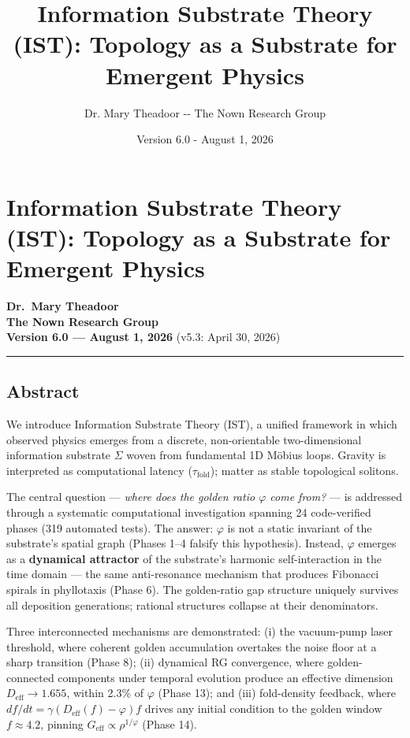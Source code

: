 \documentclass[
]{article}
\title{Information Substrate Theory (IST): Topology as a Substrate for
Emergent Physics}
\author{Dr. Mary Theadoor -\/- The Nown Research Group}
\date{Version 6.0 - August 1, 2026}
\begin{document}
\maketitle

{
\setcounter{tocdepth}{3}
\tableofcontents
}
\section{Information Substrate Theory (IST): Topology as a Substrate for
Emergent
Physics}\label{information-substrate-theory-ist-topology-as-a-substrate-for-emergent-physics}

\textbf{Dr.~Mary Theadoor}\\
\textbf{The Nown Research Group}\\
\textbf{Version 6.0 --- August 1, 2026} (v5.3: April 30, 2026)

\begin{center}\rule{0.5\linewidth}{0.5pt}\end{center}

\subsection{Abstract}\label{abstract}

We introduce Information Substrate Theory (IST), a unified framework in
which observed physics emerges from a discrete, non-orientable
two-dimensional information substrate \(\Sigma\) woven from fundamental
1D Möbius loops. Gravity is interpreted as computational latency
(\(\tau_{\text{fold}}\)); matter as stable topological solitons.

The central question --- \emph{where does the golden ratio \(\varphi\)
come from?} --- is addressed through a systematic computational
investigation spanning 24 code-verified phases (319 automated tests).
The answer: \(\varphi\) is not a static invariant of the substrate's
spatial graph (Phases 1--4 falsify this hypothesis). Instead,
\(\varphi\) emerges as a \textbf{dynamical attractor} of the substrate's
harmonic self-interaction in the time domain --- the same anti-resonance
mechanism that produces Fibonacci spirals in phyllotaxis (Phase 6). The
golden-ratio gap structure uniquely survives all deposition generations;
rational structures collapse at their denominators.

Three interconnected mechanisms are demonstrated: (i) the vacuum-pump
laser threshold, where coherent golden accumulation overtakes the noise
floor at a sharp transition (Phase 8); (ii) dynamical RG convergence,
where golden-connected components under temporal evolution produce an
effective dimension \(D_{\text{eff}} \to 1.655\), within 2.3\% of
\(\varphi\) (Phase 13); and (iii) fold-density feedback, where
\(df/dt = \gamma(D_{\text{eff}}(f) - \varphi)f\) drives any initial
condition to the golden window \(f \approx 4.2\), pinning
\(G_{\text{eff}} \propto \rho^{1/\varphi}\) (Phase 14).
\end{document}
